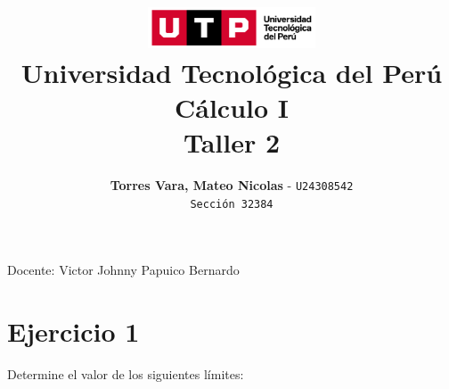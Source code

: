\documentclass[12pt]{article}
\title{
  \vspace{2cm}
  \pagenumbering{gobble}
  \includegraphics[width=5cm]{../assets/logo-utp.png} \\
  \vspace{1cm}
  \textbf{Universidad Tecnológica del Perú} \\
  \vspace{2cm}
  \textbf{Cálculo I} \\
  \vspace{1cm}
  \large \textbf{Taller 2}
}
\author{
  \textbf{Torres Vara, Mateo Nicolas} - \texttt{U24308542} \\
  \texttt{Sección 32384}
}
\begin{document}
\maketitle
\begin{center}

  Docente: Victor Johnny Papuico Bernardo

\end{center}

%
%

\newpage
{}





\section*{Ejercicio 1}
\noindent Determine el valor de los siguientes límites:
\end{document}
